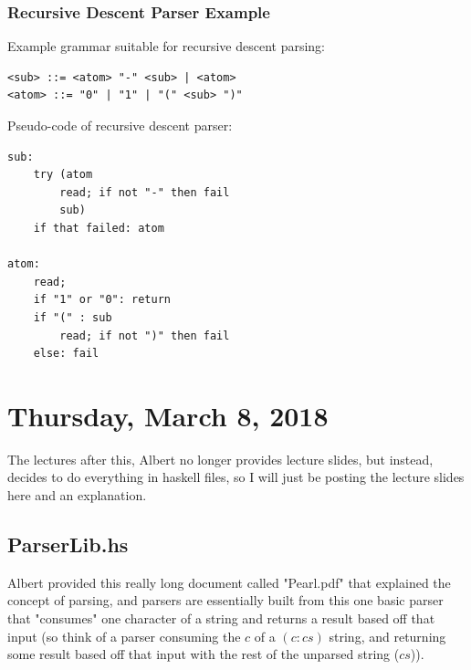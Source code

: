 \documentclass[12pt]{article}
\begin{document}
\subsubsection{Recursive Descent Parser Example}

Example grammar suitable for recursive descent parsing:

\begin{lstlisting}
<sub> ::= <atom> "-" <sub> | <atom>
<atom> ::= "0" | "1" | "(" <sub> ")"
\end{lstlisting}

Pseudo-code of recursive descent parser:

\begin{lstlisting}
sub:
	try (atom
		read; if not "-" then fail
		sub)
	if that failed: atom

atom:
	read;
	if "1" or "0": return
	if "(" : sub
		read; if not ")" then fail
	else: fail
\end{lstlisting}

\section{Thursday, March 8, 2018}

The lectures after this, Albert no longer provides lecture slides, but instead, decides to do everything in haskell files, so I will just be posting the lecture slides here and an explanation.

\subsection{ParserLib.hs}

Albert provided this really long document called "Pearl.pdf" that explained the concept of parsing, and parsers are essentially built from this one basic parser that "consumes" one character of a string and returns a result based off that input (so think of a parser consuming the $c$ of a $(c:cs)$ string, and returning some result based off that input with the rest of the unparsed string ($cs$)).
\end{document}
